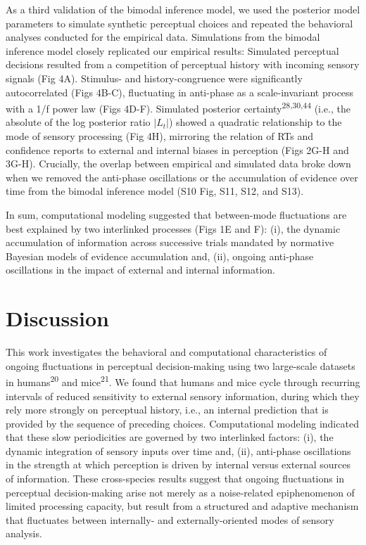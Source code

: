 \documentclass[
]{article}
\begin{document}
As a third validation of the bimodal inference model, we used the
posterior model parameters to simulate synthetic perceptual choices and
repeated the behavioral analyses conducted for the empirical data.
Simulations from the bimodal inference model closely replicated our
empirical results: Simulated perceptual decisions resulted from a
competition of perceptual history with incoming sensory signals (Fig
4A). Stimulus- and history-congruence were significantly autocorrelated
(Figs 4B-C), fluctuating in anti-phase as a scale-invariant process
with a 1/f power law (Figs 4D-F). Simulated posterior
certainty\textsuperscript{28,30,44} (i.e., the absolute of the log
posterior ratio \(|L_t|\)) showed a quadratic relationship to the mode
of sensory processing (Fig 4H), mirroring the relation of RTs and
confidence reports to external and internal biases in perception (Figs
2G-H and 3G-H). Crucially, the overlap between empirical and
simulated data broke down when we removed the anti-phase oscillations or
the accumulation of evidence over time from the bimodal inference model
(S10 Fig, S11, S12, and S13).

In sum, computational modeling suggested that between-mode fluctuations
are best explained by two interlinked processes (Figs 1E and F): (i),
the dynamic accumulation of information across successive trials
mandated by normative Bayesian models of evidence accumulation and,
(ii), ongoing anti-phase oscillations in the impact of external and
internal information.

\hypertarget{discussion}{%
\section{Discussion}\label{discussion}}

This work investigates the behavioral and computational characteristics
of ongoing fluctuations in perceptual decision-making using two
large-scale datasets in humans\textsuperscript{20} and
mice\textsuperscript{21}. We found that humans and mice cycle through
recurring intervals of reduced sensitivity to external sensory
information, during which they rely more strongly on perceptual history,
i.e., an internal prediction that is provided by the sequence of
preceding choices. Computational modeling indicated that these slow
periodicities are governed by two interlinked factors: (i), the dynamic
integration of sensory inputs over time and, (ii), anti-phase
oscillations in the strength at which perception is driven by internal
versus external sources of information. These cross-species results
suggest that ongoing fluctuations in perceptual decision-making arise
not merely as a noise-related epiphenomenon of limited processing
capacity, but result from a structured and adaptive mechanism that
fluctuates between internally- and externally-oriented modes of sensory
analysis.
\end{document}
